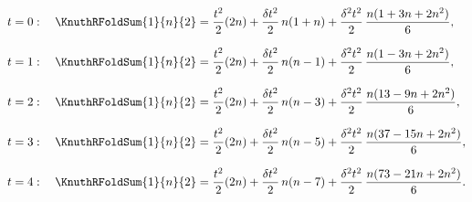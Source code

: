 \begin{example} 
  \begin{align*}
    t=0:\quad
    \KnuthRFoldSum{1}{n}{2}
    &=
    \frac{t^2}{2}(2n)
    +
    \frac{\delta t^2}{2}\, n(1+n)
    +
    \frac{\delta^2 t^2}{2}\,\frac{n(1+3n+2n^2)}{6},
    \\[8pt]
    t=1:\quad
    \KnuthRFoldSum{1}{n}{2}
    &=
    \frac{t^2}{2}(2n)
    +
    \frac{\delta t^2}{2}\, n(n-1)
    +
    \frac{\delta^2 t^2}{2}\,\frac{n(1-3n+2n^2)}{6},
    \\[8pt]
    t=2:\quad
    \KnuthRFoldSum{1}{n}{2}
    &=
    \frac{t^2}{2}(2n)
    +
    \frac{\delta t^2}{2}\, n(n-3)
    +
    \frac{\delta^2 t^2}{2}\,\frac{n(13-9n+2n^2)}{6},
    \\[8pt]
    t=3:\quad
    \KnuthRFoldSum{1}{n}{2}
    &=
    \frac{t^2}{2}(2n)
    +
    \frac{\delta t^2}{2}\, n(n-5)
    +
    \frac{\delta^2 t^2}{2}\,\frac{n(37-15n+2n^2)}{6},
    \\[8pt]
    t=4:\quad
    \KnuthRFoldSum{1}{n}{2}
    &=
    \frac{t^2}{2}(2n)
    +
    \frac{\delta t^2}{2}\, n(n-7)
    +
    \frac{\delta^2 t^2}{2}\,\frac{n(73-21n+2n^2)}{6}.
  \end{align*}
\end{example}

